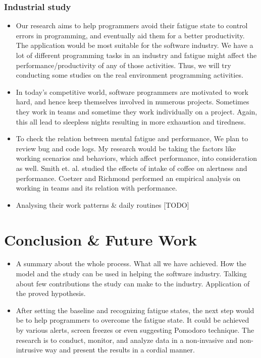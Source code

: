 \documentclass{acm_proc_article-sp}
\begin{document}
\subsubsection{Industrial study}
\begin{itemize}
  \item Our research aims to help programmers avoid their fatigue state to
  control errors in programming, and eventually aid them for a better
  productivity. The application would be most suitable for the software
  industry. We have a lot of different programming tasks in an industry and
  fatigue might affect the performance/productivity of any of those
  activities. Thus, we will try conducting some studies on the real environment
  programming activities.
  \item In today's competitive world, software programmers are motivated to work
  hard, and hence keep themselves involved in numerous projects. Sometimes they
  work in teams and sometime they work individually on a project. Again, this
  all lead to sleepless nights resulting in more exhaustion and tiredness.
  \item To check the relation between mental fatigue and performance, We plan to
  review bug and code logs. My research would be taking the factors like working
  scenarios and behaviors, which affect performance, into consideration as well.
  Smith et. al. \cite{smith:coffee} studied the effects of intake of coffee on
  alertness and performance. Coetzer and Richmond \cite{richmond:team} performed
  an empirical analysis on working in teams and its relation with performance.
  \item Analysing their work patterns \& daily routines [TODO]
\end{itemize}

\section{Conclusion \& Future Work}
\begin{itemize}
\item A summary about the whole process. What all we have achieved. 
How the model and the study can be used in helping the software industry.
Talking about few contributions the study can make to the industry.
Application of the proved hypothesis.
\item After setting the baseline and recognizing fatigue states, the next step
would be to help programmers to overcome the fatigue state. It could be achieved
by various alerts, screen freezes or even suggesting Pomodoro technique. The
research is to conduct, monitor, and analyze data in a non-invasive and
non-intrusive way and present the results in a cordial manner.
\end{itemize}
\end{document}
